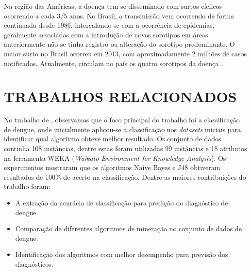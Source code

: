 \documentclass[
	12pt,				%
	openright,			%
	oneside,	
	a4paper,				%
	english,				%
	brazil				%
]{abntex2/abntex2} %
\begin{document}
	Na região das Américas, a doença tem se disseminado com surtos cíclicos ocorrendo a cada 3/5 anos. No Brasil, a transmissão vem ocorrendo de forma continuada desde 1986, intercalando-se com a ocorrência de epidemias, geralmente associadas com a introdução de novos sorotipos em áreas anteriormente não se tinha registro ou alteração do sorotipo predominante. O maior surto no Brasil ocorreu em 2013, com aproximadamente 2 milhões de casos notificados. Atualmente, circulam no país os quatro sorotipos da doença \cite{MS:2015}.
	

	\vspace{-1.5\baselineskip}
	\section{TRABALHOS RELACIONADOS}	
	\vspace{1\baselineskip}
	No trabalho de \cite{shakil:2015}, observamos que o foco principal do trabalho foi a classificação de dengue, onde inicialmente aplicou-se a classificação nos \textit{datasets} iniciais para identificar qual algoritmo obteve melhor resultado. Os conjunto de dados continha 108 instâncias, dentre estas foram utilizadas 99 instâncias e  18 atributos na ferramenta WEKA (\textit{Waikato Environment for Knowledge Analysis}). Os experimentos mostraram que os algoritmos Naive Bayes e J48 obtiveram resultados de 100\% de acerto na classificação. Dentre as maiores contribuições do trabalho foram:
	
	\begin{itemize}
		\item A extração da acurácia de classificação para predição do diagnóstico de dengue.
		\item Comparação de diferentes algoritmos de mineração no conjunto de dados de dengue.
		\item Identificação dos algoritmos com melhor desempenho para previsão dos diagnósticos.
	\end{itemize}
	
\end{document}

